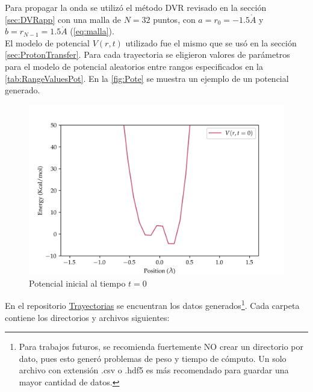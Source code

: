 Para propagar la onda se utilizó el método \acs{DVR} revisado en la sección \autoref{sec:DVRapp} con una malla de $N=32$ puntos, con $a=r_0=-1.5\mathring{A}$ y $b=r_{N-1}=1.5\mathring{A}$ (\autoref{eq:malla}).
\\
El modelo de potencial $V(r,t)$ utilizado fue el mismo que se usó en la sección \autoref{sec:ProtonTransfer}. Para cada trayectoria se eligieron valores de parámetros para el modelo de potencial aleatorios entre rangos especificados en la \autoref{tab:RangeValuesPot}. En la \autoref{fig:Pote} se muestra un ejemplo de un potencial generado.
\begin{figure}[H]
  \centering
  \includegraphics[width=1\textwidth]{./img/DataPot.png}
  \caption{Potencial inicial al tiempo $t=0$}
  \label{fig:Pote}
\end{figure}

En el repositorio \href{https://github.com/Jessi-MM/PropagatorLearning/tree/main/Data_Gaussian}{\faGithub Trayectorias} se encuentran los datos generados\footnote{\textcolor{CTtitle}{\faExclamationTriangle} Para trabajos futuros, se recomienda fuertemente NO crear un directorio por dato, pues esto generó problemas de peso y tiempo de cómputo. Un solo archivo con extensión .csv o .hdf5 es más recomendado para guardar una mayor cantidad de datos.}. Cada carpeta contiene los directorios y archivos siguientes:

